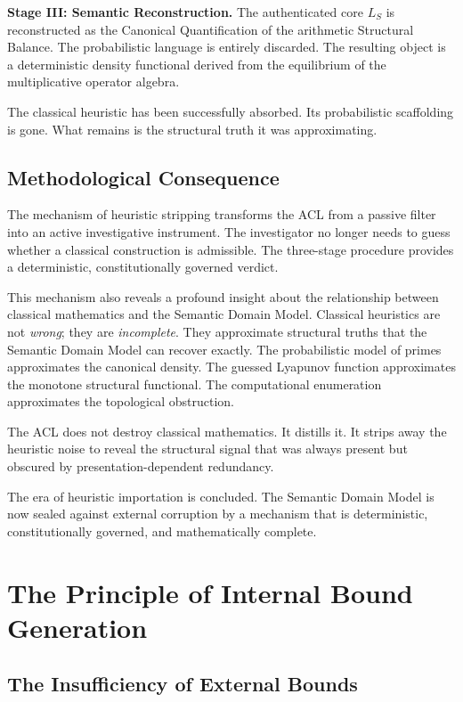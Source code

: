 \documentclass[12pt,openany]{extbook}
\theoremstyle{plain}
\theoremstyle{definition}
\begin{document}
\textbf{Stage III: Semantic Reconstruction.}
The authenticated core $L_S$ is reconstructed as the Canonical Quantification of the arithmetic Structural Balance. The probabilistic language is entirely discarded. The resulting object is a deterministic density functional derived from the equilibrium of the multiplicative operator algebra.

The classical heuristic has been successfully absorbed. Its probabilistic scaffolding is gone. What remains is the structural truth it was approximating.

\section{Methodological Consequence}

The mechanism of heuristic stripping transforms the ACL from a passive filter into an active investigative instrument. The investigator no longer needs to guess whether a classical construction is admissible. The three-stage procedure provides a deterministic, constitutionally governed verdict.

This mechanism also reveals a profound insight about the relationship between classical mathematics and the Semantic Domain Model. Classical heuristics are not \emph{wrong}; they are \emph{incomplete}. They approximate structural truths that the Semantic Domain Model can recover exactly. The probabilistic model of primes approximates the canonical density. The guessed Lyapunov function approximates the monotone structural functional. The computational enumeration approximates the topological obstruction.

The ACL does not destroy classical mathematics. It distills it. It strips away the heuristic noise to reveal the structural signal that was always present but obscured by presentation-dependent redundancy.

The era of heuristic importation is concluded. The Semantic Domain Model is now sealed against external corruption by a mechanism that is deterministic, constitutionally governed, and mathematically complete.

\chapter{The Principle of Internal Bound Generation}

\section{The Insufficiency of External Bounds}
\end{document}
